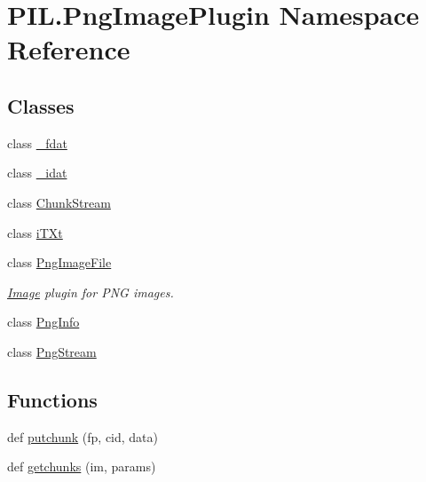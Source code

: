 \hypertarget{namespacePIL_1_1PngImagePlugin}{}\section{P\+I\+L.\+Png\+Image\+Plugin Namespace Reference}
\label{namespacePIL_1_1PngImagePlugin}
\subsection*{Classes}
\begin{DoxyCompactItemize}
\item 
class \hyperlink{classPIL_1_1PngImagePlugin_1_1__fdat}{\+\_\+fdat}
\item 
class \hyperlink{classPIL_1_1PngImagePlugin_1_1__idat}{\+\_\+idat}
\item 
class \hyperlink{classPIL_1_1PngImagePlugin_1_1ChunkStream}{Chunk\+Stream}
\item 
class \hyperlink{classPIL_1_1PngImagePlugin_1_1iTXt}{i\+T\+Xt}
\item 
class \hyperlink{classPIL_1_1PngImagePlugin_1_1PngImageFile}{Png\+Image\+File}
\begin{DoxyCompactList}\small\item\em \hyperlink{namespacePIL_1_1Image}{Image} plugin for P\+NG images. \end{DoxyCompactList}\item 
class \hyperlink{classPIL_1_1PngImagePlugin_1_1PngInfo}{Png\+Info}
\item 
class \hyperlink{classPIL_1_1PngImagePlugin_1_1PngStream}{Png\+Stream}
\end{DoxyCompactItemize}
\subsection*{Functions}
\begin{DoxyCompactItemize}
\item 
def \hyperlink{namespacePIL_1_1PngImagePlugin_af2f297938bcd84ab25922b31cf074fa7}{putchunk} (fp, cid, data)
\item 
def \hyperlink{namespacePIL_1_1PngImagePlugin_af5721b5beee36ef77f780386f738ab11}{getchunks} (im, params)
\end{DoxyCompactItemize}
